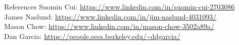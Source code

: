\documentclass{resume} %
\begin{document}
\begin{rSection}{References}
Suomin Cui: \url{https://www.linkedin.com/in/suomin-cui-2703086} \\
James Naslund: \url{https://www.linkedin.com/in/jim-naslund-4031093/} \\
Mason Chow: \url{https://www.linkedin.com/in/mason-chow-3502a89a/} \\
Dan Garcia: \url{https://people.eecs.berkeley.edu/~ddgarcia/}
\end{rSection}
\end{document}
